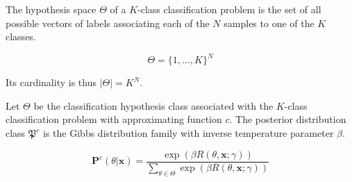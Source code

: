 The hypothesis space $\Theta$ of a $K$-class classification problem is the set of
all possible vectors of labels associating each of the $N$ samples
to one of the $K$ classes. 

$$
\Theta = \{1, \dots, K \}^N
$$

Its cardinality is thus $|\Theta| = K^N$.

\begin{theorem}
    Let $\Theta$ be the classification hypothesis class associated with the 
    $K$-class classification problem with approximating function $c$.
    The posterior distribution class $\mathfrak{P}^c$ is the Gibbs
    distribution family with inverse temperature parameter $\beta$.

    $$
        \mathbf{P}^c (\theta | \bm{x}) = \frac{\exp \left ( \beta R(\theta, \bm{x}; \gamma) \right )}{\sum_{\theta \in \Theta} \exp \left ( \beta R(\theta, \bm{x}; \gamma) \right )} 
    $$
\end{theorem}

